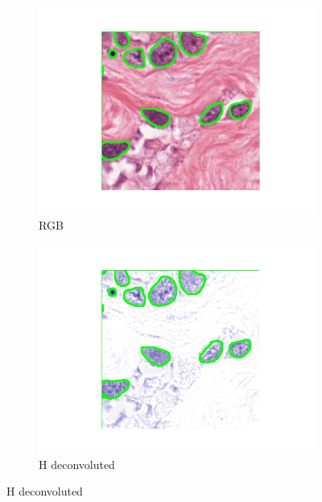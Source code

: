 \documentclass[target=bach,aauheader=,style=]{thud}
\begin{document}
\begin{figure}[!htbp]
\begin{subfigure}{0.48\textwidth}
  \centering
  \includegraphics[width=\linewidth]{imgs/qualitative/best/RGB/contour_img.png}
  \caption{RGB}
\end{subfigure}\hfill
\begin{subfigure}{0.48\textwidth}
  \centering
  \includegraphics[width=\linewidth]{imgs/qualitative/best/HE/contour_img.png}
  \caption{H deconvoluted}
\end{subfigure}


\end{figure}
\end{document}
